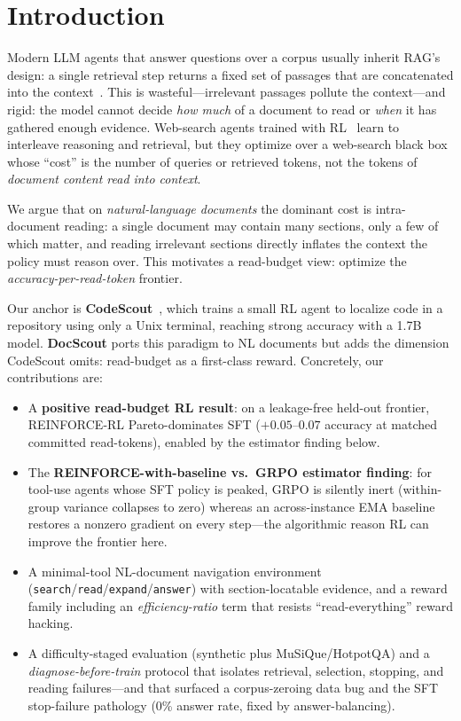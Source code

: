 \documentclass[10pt,twocolumn]{article}
\begin{document}
\section{Introduction}
Modern LLM agents that answer questions over a corpus usually inherit RAG's design: a single retrieval step returns a fixed set of passages that are concatenated into the context~\cite{rag2020}. This is wasteful---irrelevant passages pollute the context---and rigid: the model cannot decide \emph{how much} of a document to read or \emph{when} it has gathered enough evidence. Web-search agents trained with RL~\cite{searchr1,research} learn to interleave reasoning and retrieval, but they optimize over a web-search black box whose ``cost'' is the number of queries or retrieved tokens, not the tokens of \emph{document content read into context}.

We argue that on \emph{natural-language documents} the dominant cost is intra-document reading: a single document may contain many sections, only a few of which matter, and reading irrelevant sections directly inflates the context the policy must reason over. This motivates a read-budget view: optimize the \emph{accuracy-per-read-token} frontier.

Our anchor is \textbf{CodeScout}~\cite{codescout2026}, which trains a small RL agent to localize code in a repository using only a Unix terminal, reaching strong accuracy with a 1.7B model. \textbf{DocScout} ports this paradigm to NL documents but adds the dimension CodeScout omits: read-budget as a first-class reward. Concretely, our contributions are:
\begin{itemize}\itemsep0pt
  \item A \textbf{positive read-budget RL result}: on a leakage-free held-out frontier, REINFORCE-RL Pareto-dominates SFT ($+0.05$--$0.07$ accuracy at matched committed read-tokens), enabled by the estimator finding below.
  \item The \textbf{REINFORCE-with-baseline vs.\ GRPO estimator finding}: for tool-use agents whose SFT policy is peaked, GRPO is silently inert (within-group variance collapses to zero) whereas an across-instance EMA baseline restores a nonzero gradient on every step---the algorithmic reason RL can improve the frontier here.
  \item A minimal-tool NL-document navigation environment (\texttt{search}/\texttt{read}/\texttt{expand}/\texttt{answer}) with section-locatable evidence, and a reward family including an \emph{efficiency-ratio} term that resists ``read-everything'' reward hacking.
  \item A difficulty-staged evaluation (synthetic plus MuSiQue/HotpotQA) and a \emph{diagnose-before-train} protocol that isolates retrieval, selection, stopping, and reading failures---and that surfaced a corpus-zeroing data bug and the SFT stop-failure pathology (0\% answer rate, fixed by answer-balancing).
\end{itemize}
\end{document}
